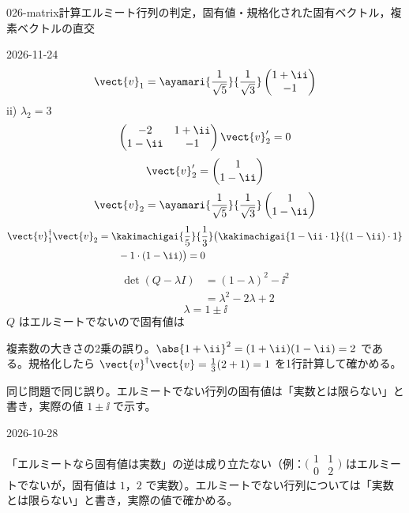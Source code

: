 \documentclass[uplatex,dvipdfmx,a4paper,11pt]{jsarticle}
\begin{document}
\begin{mondai}{026-matrix}{計算}{エルミート行列の判定，固有値・規格化された固有ベクトル，複素ベクトルの直交}
\begin{kotaeutsushi}{2026-11-24}
\[ \vect{v}_{1}=\ayamari{\frac{1}{\sqrt{5}}}{\frac{1}{\sqrt{3}}}\begin{pmatrix}1+\ii\\ -1\end{pmatrix} \]
ii) $\lambda_{2}=3$
\[ \begin{pmatrix}-2 & 1+\ii\\ 1-\ii & -1\end{pmatrix}\vect{v}_{2}'=0 \]
\[ \vect{v}_{2}'=\begin{pmatrix}1\\ 1-\ii\end{pmatrix} \]
\[ \vect{v}_{2}=\ayamari{\frac{1}{\sqrt{5}}}{\frac{1}{\sqrt{3}}}\begin{pmatrix}1\\ 1-\ii\end{pmatrix} \]
\begin{align*}
\vect{v}_{1}^{\dagger}\vect{v}_{2}
&=\kakimachigai{\frac{1}{5}}{\frac{1}{3}}\bigl(\kakimachigai{1-\ii\cdot 1}{(1-\ii)\cdot 1}\\
&\qquad-1\cdot(1-\ii)\bigr)=0
\end{align*}
\begin{align*}
\det(Q-\lambda I)&=(1-\lambda)^{2}-\ii^{2}\\
&=\lambda^{2}-2\lambda+2
\end{align*}
\[ \lambda=1\pm\ii \]
$Q$ はエルミートでないので固有値は
\end{kotaeutsushi}
\begin{kizuki}
\item {} 複素数の大きさの2乗の誤り。$\abs{1+\ii}^{2}=(1+\ii)(1-\ii)=2$ である。規格化したら $\vect{v}^{\dagger}\vect{v}=\frac{1}{3}(2+1)=1$ を1行計算して確かめる。
\item {} 同じ問題で同じ誤り。エルミートでない行列の固有値は「実数とは限らない」と書き，実際の値 $1\pm\ii$ で示す。
\end{kizuki}
\begin{maekizuki}{2026-10-28}
\item 「エルミートなら固有値は実数」の逆は成り立たない（例：$\bigl(\begin{smallmatrix}1&1\\0&2\end{smallmatrix}\bigr)$ はエルミートでないが，固有値は $1$，$2$ で実数）。エルミートでない行列については「実数とは限らない」と書き，実際の値で確かめる。

\end{maekizuki}
\end{mondai}
\end{document}
